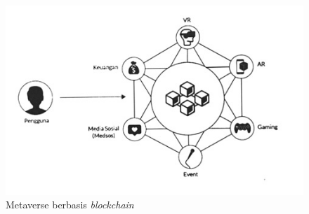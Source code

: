 \begin{figure} [ht] \centering
  \includegraphics[scale=0.6]{gambar/img-metaverse-blockchain-4.jpg}
  \caption{Metaverse berbasis \emph{blockchain}}
  \label{fig:Metaverse Blockchain}
\end{figure}
